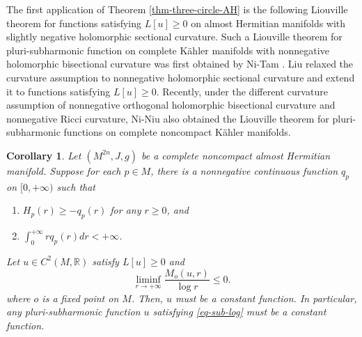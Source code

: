 \documentclass[12pt]{amsart}
\newcommand\R{{\mathbb R}}
\newtheorem{cor}{Corollary}[section]
\theoremstyle{definition}
\theoremstyle{remark}
\numberwithin{equation}{section}
\def\D{\displaystyle}
\begin{document}
The first application of Theorem \ref{thm-three-circle-AH} is the following Liouville theorem for functions satisfying $L[u]\geq 0$ on almost Hermitian manifolds with slightly negative holomorphic sectional curvature. Such a Liouville theorem for pluri-subharmonic function on complete K\"ahler manifolds with nonnegative holomorphic bisectional curvature was first obtained by Ni-Tam \cite{NT}. Liu \cite{Liu} relaxed the curvature assumption to nonnegative holomorphic sectional curvature and extend it to functions satisfying $L[u]\geq 0$. Recently, under the different curvature assumption of nonnegative orthogonal holomorphic bisectional curvature and nonnegative Ricci curvature, Ni-Niu \cite{NN} also obtained the Liouville theorem for pluri-subharmonic functions on complete noncompact K\"ahler manifolds.
\begin{cor}\label{cor-Liouville-psh-2}
Let $(M^{2n},J,g)$ be a complete noncompact almost Hermitian manifold. Suppose for each $p\in M$, there is a nonnegative continuous function $q_p$ on $[0,+\infty)$ such that
\begin{enumerate}
\item $H_p(r)\geq -q_p(r)$ for any $r\geq0$, and
\item $\D\int_0^{+\infty}rq_p(r)dr<+\infty$.
\end{enumerate}
Let $u\in C^2(M,\R)$ satisfy $L[u]\geq 0$ and
\begin{equation}\label{eq-sub-log}
\liminf_{r\to+\infty}\frac{M_o(u,r)}{\log r}\leq 0.
\end{equation}
where $o$ is a fixed point on $M$. Then, $u$ must be a constant function. In particular, any pluri-subharmonic function $u$ satisfying \eqref{eq-sub-log} must be a constant function.
\end{cor}
\end{document}
